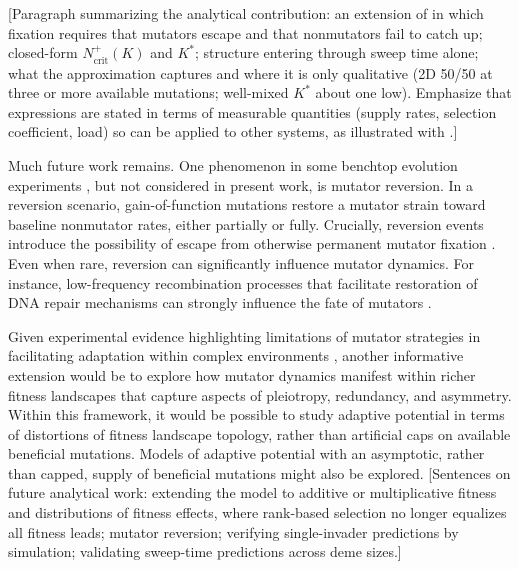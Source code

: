 [Paragraph summarizing the analytical contribution: an extension of \citet{raynes2018sign} in which fixation requires that mutators escape and that nonmutators fail to catch up; closed-form $N_\mathrm{crit}^{+}(K)$ and $K^*$; structure entering through sweep time alone; what the approximation captures and where it is only qualitative (2D 50/50 at three or more available mutations; well-mixed $K^*$ about one low). Emphasize that expressions are stated in terms of measurable quantities (supply rates, selection coefficient, load) so can be applied to other systems, as illustrated with \citet{callens2023hypermutator}.]

Much future work remains.
One phenomenon in some benchtop evolution experiments \citep{ho2021evolutionary}, but not considered in present work, is mutator reversion.
In a reversion scenario, gain-of-function mutations restore a mutator strain toward baseline nonmutator rates, either partially or fully.
Crucially, reversion events introduce the possibility of escape from otherwise permanent mutator fixation \citep{taddei1997role}.
Even when rare, reversion can significantly influence mutator dynamics.
For instance, low-frequency recombination processes that facilitate restoration of DNA repair mechanisms can strongly influence the fate of mutators \citep{tenaillon2000mutators}.

Given experimental evidence highlighting limitations of mutator strategies in facilitating adaptation within complex environments \citep{ho2021evolutionary}, another informative extension would be to explore how mutator dynamics manifest within richer fitness landscapes that capture aspects of pleiotropy, redundancy, and asymmetry.
Within this framework, it would be possible to study adaptive potential in terms of distortions of fitness landscape topology, rather than artificial caps on available beneficial mutations.
Models of adaptive potential with an asymptotic, rather than capped, supply of beneficial mutations might also be explored.
[Sentences on future analytical work: extending the model to additive or multiplicative fitness and distributions of fitness effects, where rank-based selection no longer equalizes all fitness leads; mutator reversion; verifying single-invader predictions by simulation; validating sweep-time predictions across deme sizes.]


